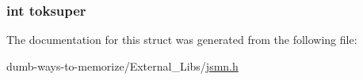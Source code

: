 \subsubsection[{\texorpdfstring{toksuper}{toksuper}}]{\setlength{\rightskip}{0pt plus 5cm}int toksuper}\hypertarget{structjsmn__parser_a81bf640a522fb6791889aac12f71f8db}{}\label{structjsmn__parser_a81bf640a522fb6791889aac12f71f8db}


The documentation for this struct was generated from the following file\+:\begin{DoxyCompactItemize}
\item 
dumb-\/ways-\/to-\/memorize/\+External\+\_\+\+Libs/\hyperlink{jsmn_8h}{jsmn.\+h}\end{DoxyCompactItemize}
